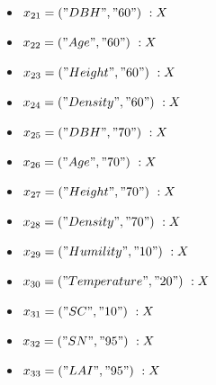 \documentclass[12pt, titlepage]{article}
\begin{document}
\begin{itemize}
\begin{itemize}
    \renewcommand{\attr}{60}
    \item $x_{21} = ("DBH", "\attr")\ :X$
    \item $x_{22} = ("Age", "\attr")\ :X$
    \item $x_{23} = ("Height", "\attr")\ :X$
    \item $x_{24} = ("Density", "\attr")\ :X$
    \vspace{0.5cm}

    \renewcommand{\attr}{70}
    \item $x_{25} = ("DBH", "\attr")\ :X$
    \item $x_{26} = ("Age", "\attr")\ :X$
    \item $x_{27} = ("Height", "\attr")\ :X$
    \item $x_{28} = ("Density", "\attr")\ :X$
    \vspace{0.5cm}

    
    \item $x_{29} = ("Humility", "10")\ :X$
    \item $x_{30} = ("Temperature", "20")\ :X$
    \item $x_{31} = ("SC", "10")\ :X$
    \item $x_{32} = ("SN", "95")\ :X$
    \item $x_{33} = ("LAI", "95")\ :X$
\end{itemize}


\end{itemize}
\end{document}
